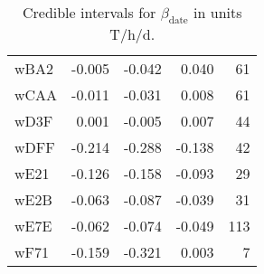\begin{table}[ht]
\begin{tabular}{lrrrr}
  wBA2 & -0.005 & -0.042 & 0.040 &   61 \\ 
  wCAA & -0.011 & -0.031 & 0.008 &   61 \\ 
  wD3F & 0.001 & -0.005 & 0.007 &   44 \\ 
  wDFF & -0.214 & -0.288 & -0.138 &   42 \\ 
  wE21 & -0.126 & -0.158 & -0.093 &   29 \\ 
  wE2B & -0.063 & -0.087 & -0.039 &   31 \\ 
  wE7E & -0.062 & -0.074 & -0.049 &  113 \\ 
  wF71 & -0.159 & -0.321 & 0.003 &    7 \\ 
   \hline
\end{tabular}
\endgroup
\caption{Credible intervals for $\beta_\text{date}$ in units T/h/d.} 
\label{tab:beta_date_all}
\end{table}
